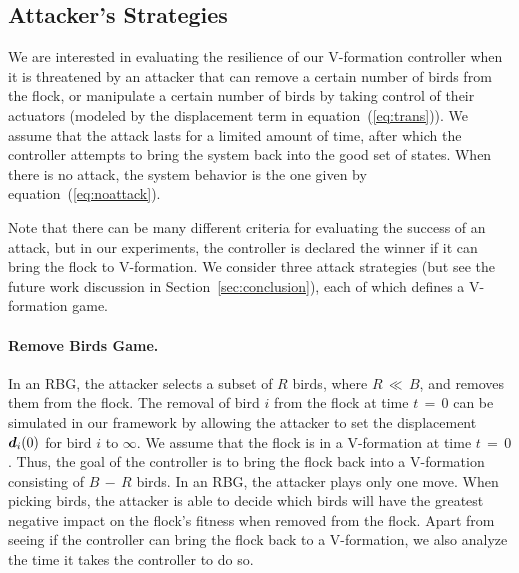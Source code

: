 \subsection{Attacker's Strategies}

We are interested in evaluating the resilience of our V-formation controller when it is threatened by an attacker that can remove a certain number of birds from the flock, or manipulate a certain number of birds by taking control of their actuators (modeled by the displacement term in equation~(\ref{eq:trans})).
We assume that the attack lasts for a limited amount of time, after which the controller attempts to bring the system back into the good set of states. When there is no attack, the system behavior is the one given by equation~(\ref{eq:noattack}).

Note that there can be many different criteria for evaluating the success of an attack,  %
but in our experiments, the controller is declared the winner if it can bring the flock to V-formation.
We consider three attack strategies (but see the future work discussion in Section~\ref{sec:conclusion}), each of which defines a V-formation game.

\vspace*{-0.5mm}\paragraph{\bf Remove Birds Game.}
In an RBG, the attacker selects a subset of $R$ birds, where $R\,{\ll}\,B$, and removes them from the flock.  The removal of bird $i$ from the flock at time $t\,{=}\,0$ can be simulated in our framework by allowing the attacker to set the displacement ${\boldsymbol {d}}_i(0)$ for bird $i$ to $\infty$.  We assume that the flock is in a V-formation at time $t\,{=}\,0$.  
Thus, the goal of the controller is to bring the flock back into a V-formation consisting of $B\,{-}\,R$ birds.
In an RBG, the attacker plays only one move.
When picking birds, the attacker is able to decide which birds will have the greatest negative impact on the flock's fitness when removed from the flock. Apart from seeing if the controller can bring the flock back to a V-formation, we also analyze the time it takes the controller to do so. 

